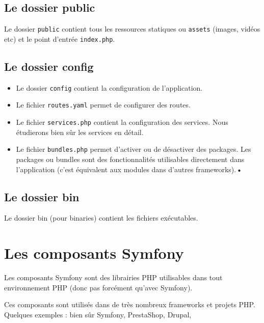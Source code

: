 \documentclass{article}
\begin{document}
\subsection{Le dossier public}
Le dossier {\tt public} contient tous les ressources statiques ou {\tt assets} (images, vidéos etc) et le point d'entrée {\tt index.php}.

\subsection{Le dossier config}
\begin{itemize}
\item Le dossier {\tt config} contient la configuration de l'application.

\item Le fichier {\tt routes.yaml} permet de configurer des routes.

\item Le fichier {\tt services.php} contient la configuration des services. Nous étudierons bien sûr les services en détail.

\item Le fichier {\tt bundles.php} permet d'activer ou de désactiver des packages. Les packages ou bundles sont des fonctionnalités utilisables directement dans l'application (c'est équivalent aux modules dans d'autres frameworks).\textbf{•}
\end{itemize}


\subsection{Le dossier bin}
Le dossier bin (pour binaries) contient les fichiers exécutables.


\section{Les composants Symfony}
Les composants Symfony sont des librairies PHP utilisables dans tout environnement PHP (donc pas forcément qu'avec Symfony).

Ces composants sont utilisés dans de très nombreux frameworks et projets PHP. Quelques exemples : bien sûr Symfony, PrestaShop, Drupal,
\end{document}
